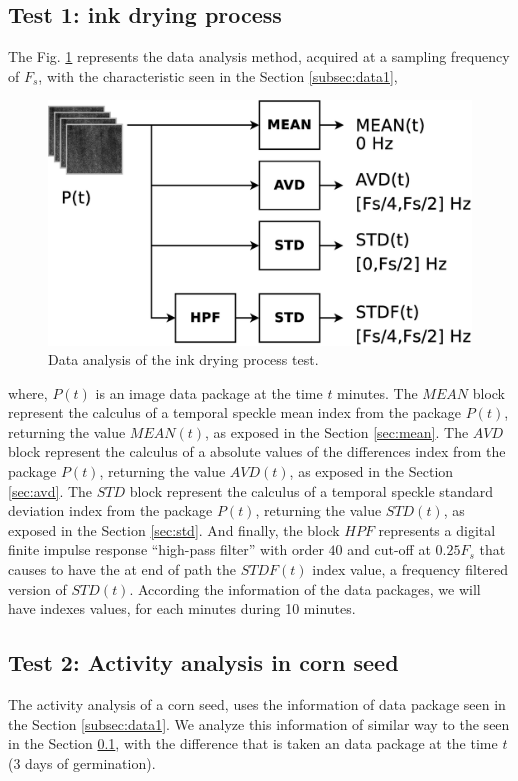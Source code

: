 \documentclass[review]{elsarticle}
\begin{document}
\subsection{Test 1: ink drying process}
\label{subsec:test1}
The Fig. \ref{fig:test1} represents the data analysis method, acquired at a 
sampling frequency of $F_s$, 
with the characteristic seen in the Section \ref{subsec:data1},
\begin{figure}[ht!]
\centering
\includegraphics[width=0.55\columnwidth]{test1.eps}
\caption{Data analysis of the ink drying process test.}
\label{fig:test1}
\end{figure}
where, $P(t)$ is an image data package at the time $t$ minutes.
The $MEAN$ block represent the calculus of a temporal speckle mean index from 
the package $P(t)$, returning the value $MEAN(t)$, as exposed in the Section \ref{sec:mean}. 
The $AVD$ block represent the calculus of a absolute values of the differences index from 
the package $P(t)$, returning the value $AVD(t)$, as exposed in the Section \ref{sec:avd}. 
The $STD$ block represent the calculus of a temporal speckle standard deviation index from 
the package $P(t)$, returning the value $STD(t)$, as exposed in the Section \ref{sec:std}.
And finally,
the block $HPF$ represents a digital finite impulse response ``high-pass filter'' 
with order $40$ and cut-off at $0.25F_s$ that causes to have the at end of path
the $STDF(t)$ index value, a frequency filtered version of $STD(t)$.
According the information of the data packages, 
we will have indexes values, for each minutes during 10 minutes.

\subsection{Test 2: Activity analysis in corn seed}
\label{subsec:test2}
The activity analysis of a corn seed, 
uses the information of data package seen in the Section \ref{subsec:data1}.
We analyze this information of similar way to the seen in the Section \ref{subsec:test1},
with the difference that is taken an data package at the time $t$ (3 days of germination). 
\end{document}
